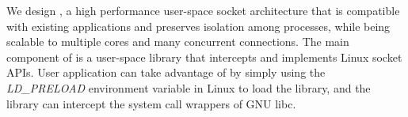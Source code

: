 



We design \sys{}, a high performance user-space socket architecture that is compatible with existing applications and preserves isolation among processes, while being scalable to multiple cores and many concurrent connections. The main component of \sys{} is a user-space library \libipc{} that intercepts and implements Linux socket APIs. User application can take advantage of \libipc by simply using the \textit{LD\_PRELOAD} environment variable in Linux to load the library, and the library can intercept the system call wrappers of GNU libc. 



